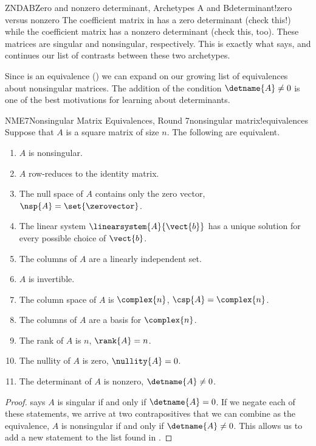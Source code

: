 \begin{example}{ZNDAB}{Zero and nonzero determinant, Archetypes A and B}{determinant!zero versus nonzero}
The coefficient matrix in  has a zero determinant (check this!) while the coefficient matrix  has a nonzero determinant (check this, too).  These matrices are singular and nonsingular, respectively.  This is exactly what  says, and continues our list of contrasts between these two archetypes.
\end{example}
%
Since  is an equivalence () we can expand on our growing list of equivalences about nonsingular matrices.  The addition of the condition $\detname{A}\neq 0$ is one of the best motivations for learning about determinants.
%
\begin{theorem}{NME7}{Nonsingular Matrix Equivalences, Round 7}{nonsingular matrix!equivalences}
Suppose that $A$ is a square matrix of size $n$.  The following are equivalent.
%
\begin{enumerate}
\item $A$ is nonsingular.
\item $A$ row-reduces to the identity matrix.
\item The null space of $A$ contains only the zero vector, $\nsp{A}=\set{\zerovector}$.
\item The linear system $\linearsystem{A}{\vect{b}}$ has a unique solution for every possible choice of $\vect{b}$.
\item The columns of $A$ are a linearly independent set.
\item $A$ is invertible.
\item The column space of $A$ is $\complex{n}$, $\csp{A}=\complex{n}$.
\item The columns of $A$ are a basis for $\complex{n}$.
\item The rank of $A$ is $n$, $\rank{A}=n$.
\item The nullity of $A$ is zero, $\nullity{A}=0$.
\item The determinant of $A$ is nonzero, $\detname{A}\neq 0$.
\end{enumerate}
\end{theorem}
%
\begin{proof}
 says $A$ is singular if and only if $\detname{A}=0$.  If we negate each of these statements, we arrive at two contrapositives that we can combine as the equivalence, $A$ is nonsingular if and only if $\detname{A}\neq 0$.  This allows us to add a new statement to the list found in .
\end{proof}
